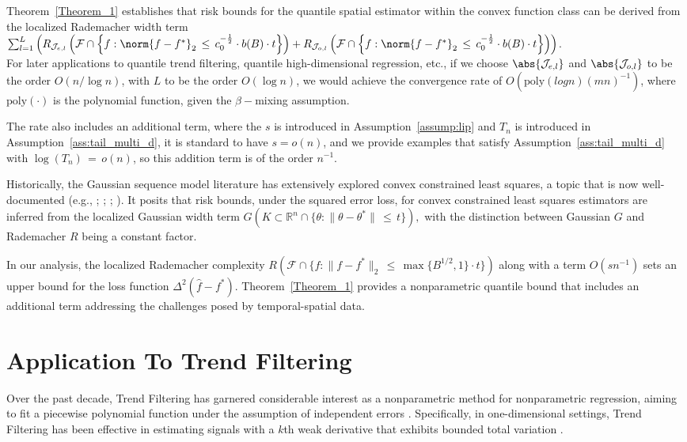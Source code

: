 \documentclass[twoside,11pt]{article}
\begin{document}
Theorem~\ref{Theorem_1} establishes that risk bounds for the quantile spatial estimator within the convex function class can be derived from the localized Rademacher width term \\ $\sum_{l=1}^L \left(R_{\mathcal{J}_{e,l}}\left(\mathcal{F}\cap \left\{f: \norm{f-f^*}_2\,\leq\, c_0^{-\frac{1}{2}}\cdot b(B)\cdot t\right\}\right) + R_{\mathcal{J}_{o,l}}\left(\mathcal{F}\cap \left\{f: \norm{f-f^*}_2\,\leq\, c_0^{-\frac{1}{2}}\cdot b(B)\cdot t\right\}\right) \right)$. \\ For later applications to quantile trend filtering, quantile high-dimensional regression, etc., if we choose $\abs{\mathcal{J}_{e,l}}$ and $\abs{\mathcal{J}_{o,l}}$ to be the order $O(n/\log n)$, with $L$ to be the order $O(\log n)$, we would achieve the convergence rate of $O(\text{poly}(log n)(mn)^{-1})$, where $\text{poly}(\cdot)$ is the polynomial function, given the $\beta-$mixing assumption. 

The rate also includes an additional term, where the $s$ is introduced in Assumption~\ref{assump:lip} and $T_n$ is introduced in Assumption~\ref{ass:tail_multi_d}, it is standard to have $s = o(n)$, and we provide examples that satisfy Assumption~\ref{ass:tail_multi_d} with $\log(T_n) \,=\, o(n)$, so this addition term is of the order \(n^{-1}\).

Historically, the Gaussian sequence model literature has extensively explored convex constrained least squares, a topic that is now well-documented (e.g., \cite{van1990estimating}; \cite{wellner2013weak}; \cite{hjort2011asymptotics}; \cite{chatterjee2015risk}). It posits that risk bounds, under the squared error loss, for convex constrained least squares estimators are inferred from the localized Gaussian width term $G(K \subset \mathbb{R}^n \cap \{ \theta : \|\theta - \theta^*\| \,\leq\, t\}),$ with the distinction between Gaussian \(G\) and Rademacher \(R\) being a constant factor.

In our analysis, the localized Rademacher complexity \(R(\mathcal{F} \cap \{ f : \|f - f^*\|_2 \,\leq\, \max\{B^{1/2},1\}\cdot t\})\) along with a term \(O(sn^{-1})\) sets an upper bound for the loss function \(\Delta^2(\hat{f} - f^*)\). Theorem~\ref{Theorem_1} provides a nonparametric quantile bound that includes an additional term addressing the challenges posed by temporal-spatial data.







\section{Application To Trend Filtering}
Over the past decade, Trend Filtering has garnered considerable interest as a nonparametric method for nonparametric regression, aiming to fit a piecewise polynomial function under the assumption of independent errors \cite{rudin1992nonlinear, mammen1997locally, tibshirani2005sparsity, kim2009ell_1}. Specifically, in one-dimensional settings, Trend Filtering has been effective in estimating signals with a $k$th weak derivative that exhibits bounded total variation \cite{tibshirani2014adaptive}.
\end{document}
